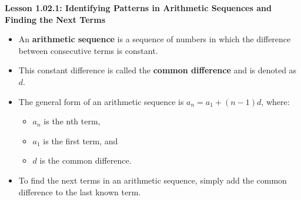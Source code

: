 \begin{center}
\textbf{Lesson 1.02.1: Identifying Patterns in Arithmetic Sequences and Finding the Next Terms}
\end{center}

\vspace*{-1.5ex}

\begin{itemize}
    \item An \textbf{arithmetic sequence} is a sequence of numbers in which the difference between consecutive terms is constant.
    \item This constant difference is called the \textbf{common difference} and is denoted as $d$.
    \item The general form of an arithmetic sequence is $a_n = a_1 + (n-1)d$, where:
    \begin{itemize}
        \item $a_n$ is the nth term,
        \item $a_1$ is the first term, and
        \item $d$ is the common difference.
    \end{itemize}
    \item To find the next terms in an arithmetic sequence, simply add the common difference to the last known term.
\end{itemize}